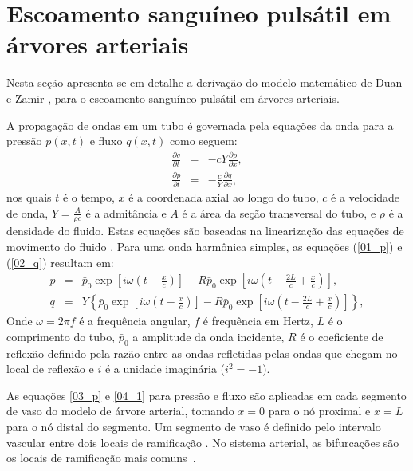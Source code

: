 \documentclass[
        english,			
        brazil			        %
        ,<...>]{abntbibufjf}
\begin{document}

\chapter{Escoamento sanguíneo pulsátil em árvores arteriais}\label{sec:escoamento}

Nesta seção apresenta-se em detalhe a derivação do modelo matemático de Duan e Zamir \cite{Duan}, para o escoamento sanguíneo pulsátil em árvores arteriais.

A propagação de ondas em um tubo é governada pela equações da onda para a pressão $p(x,t)$ e fluxo $q(x,t)$ como seguem:
\begin{eqnarray}
\frac{\partial q}{\partial t} &=& -cY \frac{\partial p}{\partial x},
\label{01_p}\\
\frac{\partial p}{\partial t} &=& -\frac{c}{Y} \frac{\partial q}{\partial x}, 
\label{02_q}
\end{eqnarray}
nos quais $t$ é o tempo, $x$ é a coordenada axial ao longo do tubo, $c$ é a velocidade de onda, $Y = \frac{A}{\rho c}$ é a admitância e $A$ é a área da seção transversal do tubo, e $\rho$ é a densidade do fluido. Estas equações são baseadas na linearização das equações de movimento do fluido \cite{Fung,Lighthill}. Para uma onda harmônica simples, as equações (\ref{01_p}) e (\ref{02_q}) resultam em:
\begin{eqnarray}
p &=& \bar{p}_0 \exp\left[i\omega\left(t - \frac{x}{c}\right)\right] + R  \bar{p}_0 \exp\left[i\omega\left(t - \frac{2L}{c} + \frac{x}{c}\right)\right],
\label{03_p}\\
q &=& Y\left\{\bar{p}_0 \exp\left[i\omega\left(t - \frac{x}{c}\right)\right] -  R  \bar{p}_0 \exp\left[i\omega\left(t - \frac{2L}{c} + \frac{x}{c}\right)\right]\right\},
\label{04_1}
\end{eqnarray}
Onde $\omega = 2 \pi f$ é a frequência angular, $f$ é frequência em Hertz, $L$ é o comprimento do tubo, $\bar{p}_0$ a amplitude da onda incidente, $R$ é o coeficiente de reflexão definido pela razão entre as ondas refletidas pelas ondas que chegam no local de reflexão \cite{Fung,Karreman} e $i$ é a unidade imaginária ($i^2 = -1$).

As equações \eqref{03_p} e \eqref{04_1} para pressão e fluxo são aplicadas em cada segmento de vaso do modelo de árvore arterial, tomando $x = 0$ para o nó proximal e $x = L$ para o nó distal do segmento. Um segmento de vaso é definido pelo intervalo vascular entre dois locais de ramificação \cite{Zamir3}. No sistema arterial, as bifurcações são os locais de ramificação mais comuns~\cite{Zamir1}.
\end{document}
